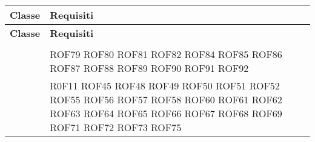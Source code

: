 \documentclass[../DefinizioneDiProdotto.tex]{subfiles}
\begin{document}
\begin{longtable}{p{8.5cm}!{\VRule[1pt]}p{2.5cm}}
\color{white} \textbf{Classe} & \color{white} \textbf{Requisiti} \\ 
\endfirsthead 
{} 
\color{white} \textbf{Classe} & \color{white} \textbf{Requisiti} \\ 
\endhead 
{} &  \\
 & ROF79 \newline 
ROF80 \newline 
ROF81 \newline 
ROF82 \newline 
ROF84 \newline 
ROF85 \newline 
ROF86 \newline 
ROF87 \newline 
ROF88 \newline 
ROF89 \newline 
ROF90 \newline 
ROF91 \newline 
ROF92 \\
 & R0F11 \newline 
ROF45 \newline 
ROF48 \newline 
ROF49 \newline 
ROF50 \newline 
ROF51 \newline 
ROF52 \newline 
ROF55 \newline 
ROF56 \newline 
ROF57 \newline 
ROF58 \newline 
ROF60 \newline 
ROF61 \newline 
ROF62 \newline 
ROF63 \newline 
ROF64 \newline 
ROF65 \newline 
ROF66 \newline 
ROF67 \newline 
ROF68 \newline 
ROF69 \newline 
ROF71 \newline 
ROF72 \newline 
ROF73 \newline 
ROF75 \newline 

\end{longtable}
\end{document}
